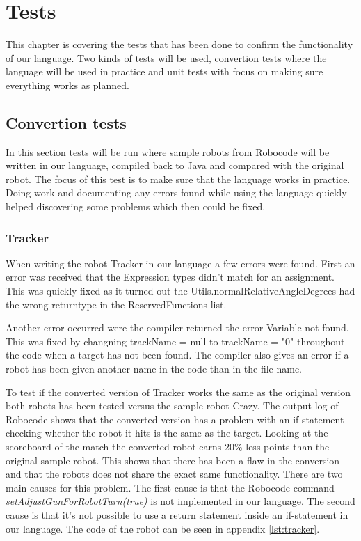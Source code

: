 \chapter{Tests}
This chapter is covering the tests that has been done to confirm the functionality of our language. Two kinds of tests will be used, convertion tests where the language will be used in practice and unit tests with focus on making sure everything works as planned.


\section{Convertion tests}
In this section tests will be run where sample robots from Robocode will be written in our language, compiled back to Java and compared with the original robot. The focus of this test is to make sure that the language works in practice. Doing work and documenting any errors found while using the language quickly helped discovering some problems which then could be fixed. 

\subsection{Tracker}
When writing the robot Tracker in our language a few errors were found. First an error was received that the Expression types didn't match for an assignment. This was quickly fixed as it turned out the Utils.normalRelativeAngleDegrees had the wrong returntype in the ReservedFunctions list.

Another error occurred were the compiler returned the error Variable not found. This was fixed by changning trackName = null to trackName = "0" throughout the code when a target has not been found. The compiler also gives an error if a robot has been given another name in the code than in the file name.

To test if the converted version of Tracker works the same as the original version both robots has been tested versus the sample robot Crazy. The output log of Robocode shows that the converted version has a problem with an if-statement checking whether the robot it hits is the same as the target. Looking at the scoreboard of the match the converted robot earns 20\% less points than the original sample robot. This shows that there has been a flaw in the conversion and that the robots does not share the exact same functionality.
There are two main causes for this problem. The first cause is that the Robocode command \emph{setAdjustGunForRobotTurn(true)} is not implemented in our language. The second cause is that it's not possible to use a return statement inside an if-statement in our language.
The code of the robot can be seen in appendix \ref{lst:tracker}.


